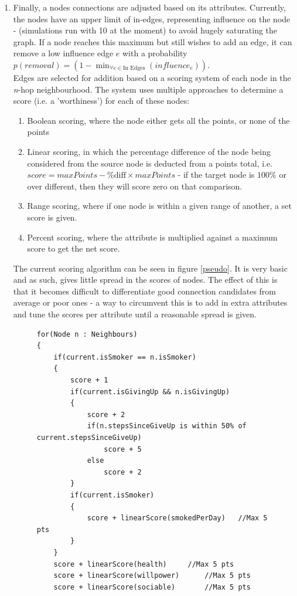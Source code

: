 \documentclass[]{article}
\begin{document}
\begin{enumerate}
\item Finally, a nodes connections are adjusted based on its attributes. Currently, the nodes have an upper limit of in-edges, representing influence on the node - (simulations run with 10 at the moment) to avoid hugely saturating the graph. If a node reaches this maximum but still wishes to add an edge, it can remove a low influence edge $e$ with a probability $p(removal) = (1 - \operatorname{min}_{\forall e \in \text{In Edges}}(influence_{e}))$.
\\
Edges are selected for addition based on a scoring system of each node in the \emph{n}-hop neighbourhood. The system uses multiple approaches to determine a score (i.e. a 'worthiness') for each of these nodes:
\begin{enumerate}
\item Boolean scoring, where the node either gets all the points, or none of the points
\item Linear scoring, in which the percentage difference of the node being considered from the source node is deducted from a points total, i.e. $score = maxPoints - \text{\% diff} \times maxPoints$ - if the target node is $100\%$ or over different, then they will score zero on that comparison.
\item Range scoring, where if one node is within a given range of another, a set score is given.
\item Percent scoring, where the attribute is multiplied against a maximum score to get the net score. 
\end{enumerate}
The current scoring algorithm can be seen in figure \ref{pseudo}. It is very basic and as such, gives little spread in the scores of nodes. The effect of this is that it becomes difficult to differentiate good connection candidates from average or poor ones - a way to circumvent this is to add in extra attributes and tune the scores per attribute until a reasonable spread is given.

\begin{figure}
\begin{center}
	\begin{lstlisting}
for(Node n : Neighbours)
{
	if(current.isSmoker == n.isSmoker)
	{
		score + 1
		if(current.isGivingUp && n.isGivingUp)
		{
			score + 2
			if(n.stepsSinceGiveUp is within 50% of current.stepsSinceGiveUp)
				score + 5
			else
				score + 2
		}
		if(current.isSmoker)
		{
			score + linearScore(smokedPerDay) 	//Max 5 pts
		}
	}
	score + linearScore(health)		//Max 5 pts
	score + linearScore(willpower)		//Max 5 pts
	score + linearScore(sociable)		//Max 5 pts


\end{lstlisting}
\end{center}
\end{figure}
\end{enumerate}
\end{document}
